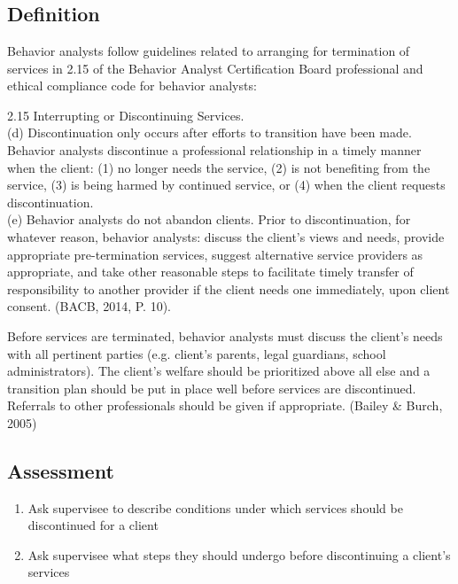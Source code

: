 \clearpage \section[\fourkTen{}]{\fourkTen{}%
              }
\subsection{Definition}
Behavior analysts follow guidelines related to arranging for termination of services in 2.15 of the Behavior Analyst Certification Board professional and ethical compliance code for behavior analysts:

2.15 Interrupting or Discontinuing Services. \\
 (d) Discontinuation only occurs after efforts to transition have been made. Behavior analysts discontinue a professional relationship in a timely manner when the client: (1) no longer needs the service, (2) is not benefiting from the service, (3) is being harmed by continued service, or (4) when the client requests discontinuation. \\
(e) Behavior analysts do not abandon clients. Prior to discontinuation, for whatever reason, behavior analysts: discuss the client's views and needs, provide appropriate pre-termination services, suggest alternative service providers as appropriate, and take other reasonable steps to facilitate timely transfer of responsibility to another provider if the client needs one immediately, upon client consent. (BACB, 2014, P. 10).

Before services are terminated, behavior analysts must discuss the client's needs with all pertinent parties (e.g. client's parents, legal guardians, school administrators). The client's welfare should be prioritized above all else and a transition plan should be put in place well before services are discontinued. Referrals to other professionals should be given if appropriate. (Bailey \& Burch, 2005)
%
\subsection{Assessment}
\begin{enumerate}
\item Ask supervisee to describe conditions under which services should be discontinued for a client
\item Ask supervisee what steps they should undergo before discontinuing a client's services
%
\end{enumerate}
%
